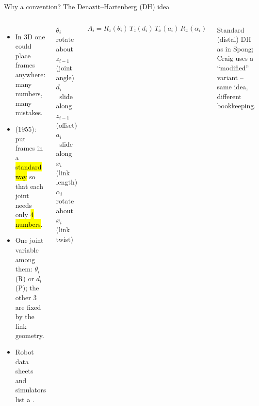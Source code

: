 \documentclass[aspectratio=169,10pt]{beamer}
\begin{document}
\begin{frame}[t]{Why a convention? The Denavit--Hartenberg (DH) idea}
\begin{columns}[T,onlytextwidth]
\begin{itemize}\small
\item In 3D one could place frames anywhere: many numbers, many mistakes.
\item {} (1955): put frames in a \hl{standard way} so that each joint needs only \hl{4 numbers}.
\item One joint variable among them: $\theta_i$ (R) or $d_i$ (P); the other 3 are fixed by the link geometry.
\item Robot data sheets and simulators list a .
\end{itemize}
\begin{defbox}
\small
$\theta_i$ \quad rotate about $z_{i-1}$ (joint angle)\\
$d_i$ \quad\ slide along $z_{i-1}$ (offset)\\
$a_i$ \quad\ slide along $x_i$ (link length)\\
$\alpha_i$ \quad rotate about $x_i$ (link twist)
\end{defbox}
\begin{eqbox}
\vspace{-2mm}
\[
A_i=R_z(\theta_i)\,T_z(d_i)\,T_x(a_i)\,R_x(\alpha_i)
\]
\vspace{-4mm}
\end{eqbox}
{\scriptsize Standard (distal) DH as in Spong; Craig uses a ``modified'' variant -- same idea, different bookkeeping.}
\end{columns}
\end{frame}
\end{document}
